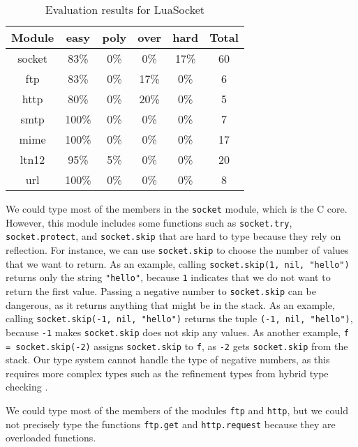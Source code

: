\begin{table}[!ht]
\begin{center}
\begin{tabular}{|c|c|c|c|c|c|}
\hline
\textbf{Module} & \textbf{easy} & \textbf{poly} & \textbf{over} & \textbf{hard} & \textbf{Total} \\
\hline
socket & 83\% & 0\% & 0\% & 17\% & 60 \\ %
\hline
ftp & 83\% & 0\% & 17\% & 0\% & 6 \\ %
\hline
http & 80\% & 0\% & 20\% & 0\% & 5 \\ %
\hline
smtp & 100\% & 0\% & 0\% & 0\% & 7 \\ %
\hline
mime & 100\% & 0\% & 0\% & 0\% & 17 \\ %
\hline
ltn12 & 95\% & 5\% & 0\% & 0\% & 20 \\ %
\hline
url & 100\% & 0\% & 0\% & 0\% & 8 \\ %
\hline
\end{tabular}
\end{center}
\caption{Evaluation results for LuaSocket}
\label{tab:evalsocket}
\end{table}

We could type most of the members in the \texttt{socket} module,
which is the C core.
However, this module includes some functions such as
\texttt{socket.try}, \texttt{socket.protect}, and \texttt{socket.skip}
that are hard to type because they rely on reflection.
For instance, we can use \texttt{socket.skip} to choose the number of
values that we want to return.
As an example, calling \texttt{socket.skip(1, nil, "hello")}
returns only the string \texttt{"hello"}, because \texttt{1} indicates
that we do not want to return the first value.
Passing a negative number to \texttt{socket.skip} can be
dangerous, as it returns anything that might be in the stack.
As an example, calling \texttt{socket.skip(-1, nil, "hello")}
returns the tuple \texttt{(-1, nil, "hello")}, because \texttt{-1} makes
\texttt{socket.skip} does not skip any values.
As another example, \texttt{f = socket.skip(-2)} assigns \texttt{socket.skip}
to \texttt{f}, as \texttt{-2} gets \texttt{socket.skip} from the stack.
Our type system cannot handle the type of negative numbers, as
this requires more complex types such as the refinement types from
hybrid type checking \citep{flanagan2006htc}.

We could type most of the members of the modules \texttt{ftp} and
\texttt{http}, but we could not precisely type
the functions \texttt{ftp.get} and \texttt{http.request} because
they are overloaded functions.

